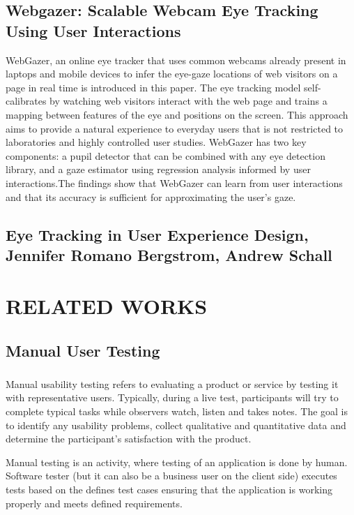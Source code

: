 \documentclass[12pt,a4paper,final]{extreport}
\begin{document}
\section{Webgazer: Scalable Webcam Eye Tracking Using User Interactions}
WebGazer, an online eye tracker that uses common webcams already present in laptops and mobile devices to infer the eye-gaze locations of web visitors on a page in real time is introduced in this paper. The eye tracking
model self-calibrates by watching web visitors interact with the web page and trains a mapping between features of the eye and positions on the screen. This
approach aims to provide a natural experience to everyday users that is not restricted to laboratories and highly controlled user studies. WebGazer has
two key components: a pupil detector that can be combined with any eye detection library, and a gaze estimator using regression analysis informed by user
interactions.The findings show that WebGazer can learn from user interactions and that its accuracy is sufficient for approximating the user’s gaze.

\section{Eye Tracking in User Experience Design, Jennifer Romano Bergstrom, Andrew Schall}
\newpage
\chapter{RELATED WORKS}
\section{Manual User Testing}
\paragraph{}
Manual usability testing refers to evaluating a product or service by testing it with representative users. Typically, during a live test, participants will try to complete typical tasks while observers watch, listen and takes notes.  The goal is to identify any usability problems, collect qualitative and quantitative data and determine the participant's satisfaction with the product.

Manual testing is an activity, where testing of an application is done by human. Software tester (but it can also be a business user on the client side) executes tests based on the defines test cases ensuring that the application is working properly and meets defined requirements.
\end{document}
